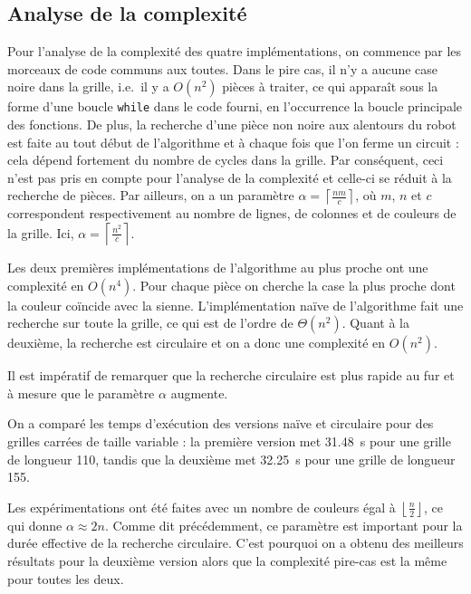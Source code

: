 \documentclass[12pt,a4paper]{article}
\begin{document}
\subsection*{Analyse de la complexit\'e}
Pour l'analyse de la complexit\'e des quatre impl\'ementations, on 
commence par les morceaux de code communs aux toutes. Dans le pire cas, 
il n'y a aucune case noire dans la grille, i.e.\ il y a $O(n^2)$ pi\`eces \`a 
traiter, ce qui appara\^it sous la forme d'une boucle \texttt{while} dans le 
code fourni, en l'occurrence la boucle principale des fonctions. De 
plus, la recherche d'une pi\`ece non noire aux alentours du robot est faite au 
tout d\'ebut de l'algorithme et \`a chaque fois que l'on ferme un 
circuit : cela d\'epend fortement du nombre de cycles dans la grille. Par 
cons\'equent, ceci n'est pas pris en compte pour l'analyse de la complexit\'e et 
celle-ci se r\'eduit \`a la recherche de pi\`eces. Par ailleurs, on a un 
param\`etre $\alpha = \left \lceil \frac{nm}{c} 
\right \rceil$, o\`u $m$, $n$ et $c$ correspondent respectivement au nombre 
de lignes, de colonnes et de couleurs de la grille. Ici, $\alpha = \left \lceil 
\frac{n^2}{c} \right \rceil$.\par
Les deux premi\`eres impl\'ementations de l'algorithme au plus proche ont une 
complexit\'e en $O(n^4)$. Pour chaque pi\`ece on cherche la case la plus proche 
dont la couleur co\"incide avec la sienne. L'impl\'ementation na\"ive de 
l'algorithme fait une recherche sur toute la grille, ce qui est de l'ordre de 
$\Theta(n^2)$. Quant \`a la deuxi\`eme, la recherche est circulaire et on a donc 
une complexit\'e en $O(n^2)$.

Il est imp\'eratif de remarquer que la recherche circulaire est 
plus rapide au fur et \`a mesure que le param\`etre $\alpha$ augmente. \par
On a compar\'e les temps d'ex\'ecution des versions na\"ive et circulaire pour 
des grilles carr\'ees de taille variable : la premi\`ere version met 
\SI{31,48}{\second} pour une grille de longueur 110, tandis que la deuxi\`eme 
met \SI{32,25}{\second} pour une grille de longueur 155.

Les exp\'erimentations ont \'et\'e faites avec un nombre de couleurs \'egal \`a 
$\left \lfloor \frac{n}{2} \right \rfloor$, ce qui donne $\alpha \approx 2n$. 
Comme dit pr\'ec\'edemment, ce param\`etre est important pour la dur\'ee 
effective de la recherche circulaire. C'est pourquoi on a obtenu des meilleurs 
r\'esultats pour la deuxi\`eme version alors que la complexit\'e pire-cas est 
la m\^eme pour toutes les deux.
\end{document}
